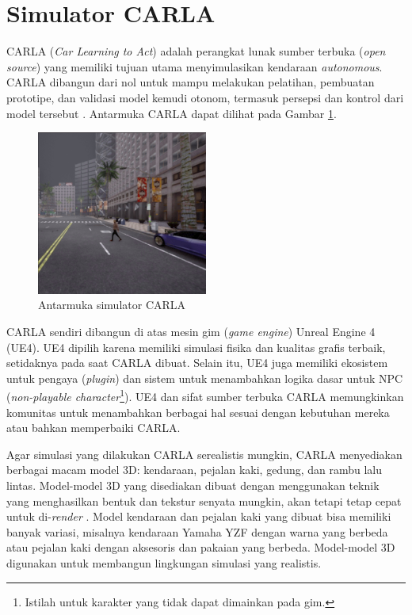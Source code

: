 \section{Simulator CARLA}\label{chapter-2-section-carla}

CARLA (\textit{Car Learning to Act}) adalah perangkat lunak sumber terbuka
(\textit{open source}) yang memiliki tujuan utama menyimulasikan kendaraan
\textit{autonomous}. CARLA dibangun dari nol untuk mampu melakukan pelatihan,
pembuatan prototipe, dan validasi model kemudi otonom, termasuk persepsi dan
kontrol dari model tersebut \parencite{dos_carla}. Antarmuka CARLA dapat dilihat
pada Gambar \ref{chapter-2-fig-carla-ui}.

\begin{figure}[!htbp]
	\centering
	\includegraphics[width=0.5\textwidth]{resources/chapter-2/CARLA-cropped.png}
	\caption{Antarmuka simulator CARLA}
	\label{chapter-2-fig-carla-ui}
\end{figure}

CARLA sendiri dibangun di atas mesin gim (\textit{game engine}) Unreal Engine 4
(UE4). UE4 dipilih karena memiliki simulasi fisika dan kualitas grafis terbaik,
setidaknya pada saat CARLA dibuat. Selain itu, UE4 juga memiliki ekosistem untuk
pengaya (\textit{plugin}) dan sistem untuk menambahkan logika dasar untuk NPC
(\textit{non-playable character}\footnote{Istilah untuk karakter yang tidak
	dapat dimainkan pada gim.}). UE4 dan sifat sumber terbuka CARLA memungkinkan
komunitas untuk menambahkan berbagai hal sesuai dengan kebutuhan mereka
\parencite{dos_carla} atau bahkan memperbaiki CARLA.

Agar simulasi yang dilakukan CARLA serealistis mungkin, CARLA menyediakan
berbagai macam model 3D: kendaraan, pejalan kaki, gedung, dan rambu lalu lintas.
Model-model 3D yang disediakan dibuat dengan menggunakan teknik yang
menghasilkan bentuk dan tekstur senyata mungkin, akan tetapi tetap cepat untuk
di-\textit{render} \parencite{dos_carla}. Model kendaraan dan pejalan kaki yang
dibuat bisa memiliki banyak variasi, misalnya kendaraan Yamaha YZF dengan warna
yang berbeda atau pejalan kaki dengan aksesoris dan pakaian yang berbeda.
Model-model 3D digunakan untuk membangun lingkungan simulasi yang realistis.

